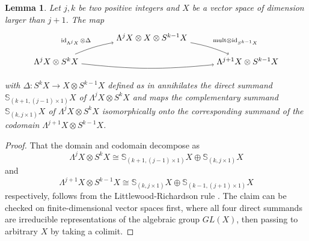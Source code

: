 \documentclass[11pt]{article}
\theoremstyle{plain}
\newtheorem{lemma}{Lemma}[section]
\theoremstyle{nonumberplain}
\theoremstyle{plain}
\numberwithin{equation}{section}
\theoremstyle{nonumberplain}
\newtheorem{proof}{Proof}
\newcommand\bS{{\mathbb S}}
\newcommand\1{{\bf 1}}
\DeclareMathOperator{\id}{id}
\begin{document}
\begin{lemma}\label{le:jrows}
  Let $j,k$ be two positive integers and $X$ be a vector space of dimension larger than $j+1$. The map
\begin{equation}\label{eq:xmap}
  \begin{tikzpicture}[auto,baseline=(current  bounding  box.center)]
    \path[anchor=base] (0,0) node (1) {$\Lambda^j X\otimes S^{k}X$}
    +(4,1) node (2) {$\Lambda^jX\otimes X\otimes S^{k-1}X$}
    +(8,0) node (4) {$\Lambda^{j+1}X\otimes S^{k-1}X$};
    \draw[->] (1) to[bend left=6] node[pos=.5,auto] {$\scriptstyle \id_{\Lambda^j X}\otimes \Delta$} (2);
    \draw[->] (1) to[bend right=6] node[pos=.5,auto,swap] {$\scriptstyle $} (4);
    \draw[->] (2) to[bend left=6] node[pos=.5,auto] {$\scriptstyle \mathrm{mult}\otimes\id_{S^{k-1}X}$} (4);
  \end{tikzpicture}
\end{equation}
with $\Delta:S^k X\to X\otimes S^{k-1}X$ defined as in  annihilates the direct summand $\bS_{(k+1, (j-1)\times 1)} X$
 of $\Lambda^j X\otimes S^{k}X$ and maps the complementary summand  $\bS_{(k, j\times 1)} X$
of $\Lambda^j X\otimes S^{k}X$ isomorphically onto the corresponding summand of the codomain $\Lambda^{j+1} X\otimes S^{k-1}X${.}
\end{lemma}
\begin{proof}
  That the domain and codomain decompose as
  \begin{equation*}
    \Lambda^j X\otimes S^{k}X\cong \bS_{(k+1, (j-1)\times 1)}X \oplus \bS_{(k, j\times 1)}X
  \end{equation*}
  and
  \begin{equation*}
    \Lambda^{j+1} X\otimes S^{k-1}X\cong \bS_{(k, j\times 1)}X \oplus \bS_{(k-1, (j+1)\times 1)}X
  \end{equation*}
  respectively, follows from the Littlewood-Richardson rule \cite[Appendix A, (A.8)]{fh-bk}. The claim can be checked on finite-dimensional vector spaces first, where all four direct summands are irreducible representations of the algebraic group $GL(X)$, then passing to arbitrary $X$ by taking a colimit.
\end{proof}
\end{document}
